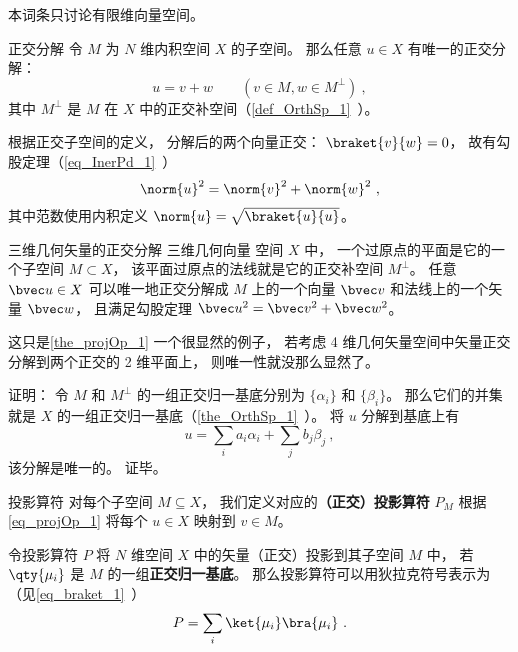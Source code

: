 

本词条只讨论有限维向量空间。

\begin{theorem}{正交分解}\label{the_projOp_1}
令 $M$ 为 $N$ 维内积空间 $X$ 的子空间。 那么任意 $u\in X$ 有唯一的正交分解：
\begin{equation}\label{eq_projOp_1}
u = v + w \qquad (v\in M, w\in M^\bot)~,
\end{equation}
其中 $M^\bot$ 是 $M$ 在 $X$ 中的正交补空间（\autoref{def_OrthSp_1}~）。
\end{theorem}
根据正交子空间的定义， 分解后的两个向量正交： $\braket{v}{w} = 0$， 故有勾股定理（\autoref{eq_InerPd_1}~）
\begin{equation}
\norm{u}^2 = \norm{v}^2 + \norm{w}^2~,
\end{equation}
其中范数使用内积定义 $\norm{u} = \sqrt{\braket{u}{u}}$。

\begin{example}{三维几何矢量的正交分解}
三维几何向量 空间 $X$ 中， 一个过原点的平面是它的一个子空间 $M \subset X$， 该平面过原点的法线就是它的正交补空间 $M^\bot$。  任意 $\bvec u \in X$ 可以唯一地正交分解成 $M$ 上的一个向量 $\bvec v$ 和法线上的一个矢量 $\bvec w$， 且满足勾股定理 $\bvec u^2 = \bvec v^2 + \bvec w^2$。

这只是\autoref{the_projOp_1} 一个很显然的例子， 若考虑 4 维几何矢量空间中矢量正交分解到两个正交的 2 维平面上， 则唯一性就没那么显然了。
\end{example}

证明： 令 $M$ 和 $M^\bot$ 的一组正交归一基底分别为 $\{\alpha_i\}$ 和 $\{\beta_i\}$。 那么它们的并集就是 $X$ 的一组正交归一基底（\autoref{the_OrthSp_1}~）。 将 $u$ 分解到基底上有
\begin{equation}
u = \sum_i a_i \alpha_i + \sum_j b_j \beta_j~,
\end{equation}
该分解是唯一的。 证毕。

\begin{definition}{投影算符}
对每个子空间 $M\subseteq X$， 我们定义对应的\textbf{（正交）投影算符} $P_M$ 根据\autoref{eq_projOp_1} 将每个 $u\in X$ 映射到 $v\in M$。
\end{definition}

\begin{theorem}{}
令投影算符 $P$ 将 $N$ 维空间 $X$ 中的矢量（正交）投影到其子空间 $M$ 中， 若 $\qty{\mu_i}$ 是 $M$ 的一组\textbf{正交归一基底}。 那么投影算符可以用狄拉克符号表示为（见\autoref{eq_braket_1}~）
\begin{equation}
P = \sum_i \ket{\mu_i}\bra{\mu_i}~.
\end{equation}
\end{theorem}



